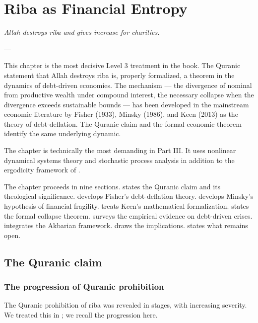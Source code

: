 \chapter{Riba as Financial Entropy}
\label{ch:riba-entropy}

\epigraph{\itshape Allah destroys riba and gives increase for
charities.}{--- }

\noindent
This chapter is the most decisive Level 3 treatment in the book.
The Quranic statement that Allah destroys riba is, properly
formalized, a theorem in the dynamics of debt-driven economies.
The mechanism --- the divergence of nominal from productive wealth
under compound interest, the necessary collapse when the divergence
exceeds sustainable bounds --- has been developed in the
mainstream economic literature by Fisher (1933), Minsky (1986), and
Keen (2013) as the theory of debt-deflation. The Quranic claim and
the formal economic theorem identify the same underlying dynamic.

The chapter is technically the most demanding in Part III. It uses
nonlinear dynamical systems theory and stochastic process analysis
in addition to the ergodicity framework of .

The chapter proceeds in nine sections.
 states the Quranic claim and its theological
significance.
 develops Fisher's debt-deflation theory.
 develops Minsky's hypothesis of financial
fragility.
 treats Keen's mathematical formalization.
 states the formal collapse theorem.
 surveys the empirical evidence on
debt-driven crises.
 integrates the Akbarian framework.
 draws the implications.
 states what remains open.

\section{The Quranic claim}
\label{sec:riba-claim}

\subsection{The progression of Quranic prohibition}

The Quranic prohibition of riba was revealed in stages, with
increasing severity. We treated this in ; we
recall the progression here.

